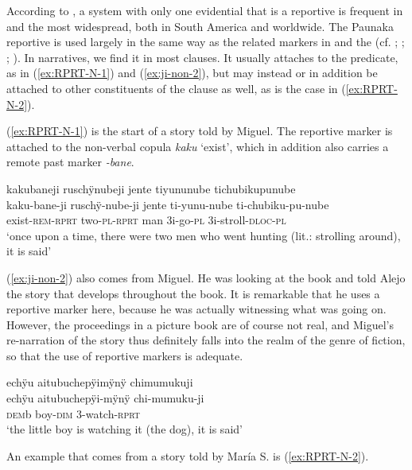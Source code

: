 According to \citet[251]{Aikhenvald2012}, a system with only one evidential that is a reportive is frequent in  and the most widespread, both in South America and worldwide.
The Paunaka reportive is used largely in the same way as the related markers in  and the  (cf. \citealt[956]{OlzaZubiri2004}; \citealt[377--378]{Danielsen2007}; \citealt[48]{Jorda2014}; \citealt[83]{Rose2014a}).
In narratives, we find it in most clauses. It usually attaches to the predicate, as in (\ref{ex:RPRT-N-1}) and (\ref{ex:ji-non-2}), but may instead or in addition be attached to other constituents of the clause as well, as is the case in (\ref{ex:RPRT-N-2}).

(\ref{ex:RPRT-N-1}) is the start of a story told by Miguel. The reportive marker is attached to the non-verbal copula \textit{kaku} ‘exist’, which in addition also carries a remote past marker \textit{-bane}.

\ea\label{ex:RPRT-N-1}
\begingl
\glpreamble kakubaneji ruschÿnubeji jente tiyununube tichubikupunube\\
\gla kaku-bane-ji ruschÿ-nube-ji jente ti-yunu-nube ti-chubiku-pu-nube\\
\glb exist-\textsc{rem}-\textsc{rprt} two-\textsc{pl}-\textsc{rprt} man 3i-go-\textsc{pl} 3i-stroll-\textsc{dloc}-\textsc{pl}\\
\glft ‘once upon a time, there were two men who went hunting (lit.: strolling around), it is said’
\endgl
\trailingcitation{[mxx-n101017s-1.014]}
\xe

(\ref{ex:ji-non-2}) also comes from Miguel. He was looking at the  book and told Alejo the story that develops throughout the book. It is remarkable that he uses a reportive marker here, because he was actually witnessing what was going on. However, the proceedings in a picture book are of course not real, and Miguel’s re-narration of the story thus definitely falls into the realm of the genre of fiction, so that the use of reportive markers is adequate.

\ea\label{ex:ji-non-2}
\begingl 
\glpreamble echÿu aitubuchepÿimÿnÿ chimumukuji\\
\gla echÿu aitubuchepÿi-mÿnÿ chi-mumuku-ji\\ 
\glb \textsc{dem}b boy-\textsc{dim} 3-watch-\textsc{rprt}\\ 
\glft ‘the little boy is watching it (the dog), it is said’
\trailingcitation{[mtx-a110906l.013]}
\xe

An example that comes from a story told by María S. is (\ref{ex:RPRT-N-2}).

